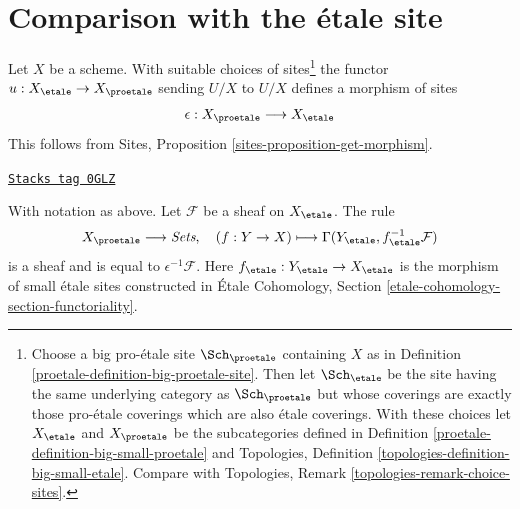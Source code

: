 \section{Comparison with the \'etale site}
\label{proetale-section-comparison}
Let $X$ be a scheme. With suitable choices of sites\footnote{Choose
a big pro-\'etale site $\Sch_\proetale$ containing $X$ as in
Definition \ref{proetale-definition-big-proetale-site}. Then let $\Sch_\etale$
be the site having the same underlying category as $\Sch_\proetale$ but
whose coverings are exactly those pro-\'etale coverings which are also
\'etale coverings. With these choices let $X_\etale$ and $X_\proetale$
be the subcategories defined in
Definition \ref{proetale-definition-big-small-proetale} and
Topologies, Definition \ref{topologies-definition-big-small-etale}.
Compare with
Topologies, Remark \ref{topologies-remark-choice-sites}.}
the functor $u : X_\etale \to X_\proetale$ sending
$U/X$ to $U/X$ defines a morphism of sites
$$
\epsilon : X_\proetale \longrightarrow X_\etale
$$
This follows from Sites, Proposition \ref{sites-proposition-get-morphism}.

\begin{lemma}
\label{proetale-lemma-describe-pullback-from-etale}
\href{https://stacks.math.columbia.edu/tag/0GLZ}{\texttt{Stacks tag 0GLZ}}

With notation as above. Let $\mathcal{F}$ be a sheaf on $X_\etale$.
The rule
$$
X_\proetale \longrightarrow \textit{Sets},\quad
(f : Y \to X) \longmapsto \Gamma(Y_\etale, f_\etale^{-1}\mathcal{F})
$$
is a sheaf and is equal to $\epsilon^{-1}\mathcal{F}$.
Here $f_\etale : Y_\etale \to X_\etale$ is the morphism of
small \'etale sites constructed in
\'Etale Cohomology, Section \ref{etale-cohomology-section-functoriality}.
\end{lemma}

